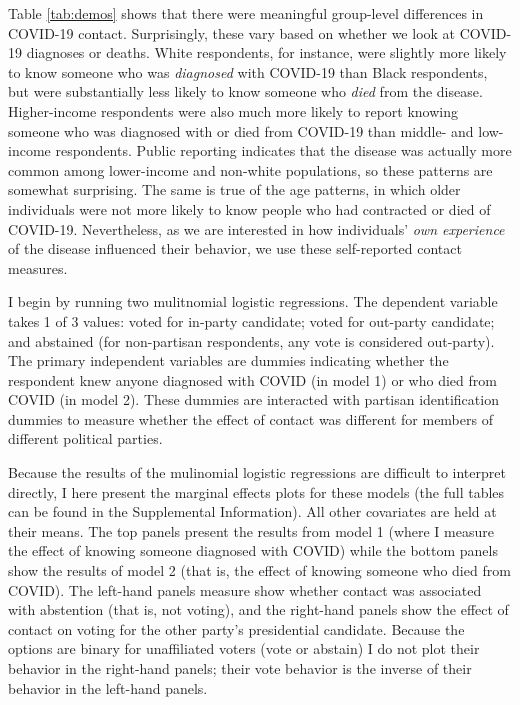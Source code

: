 \documentclass[
  12pt,
]{article}
\begin{document}
Table \ref{tab:demos} shows that there were meaningful group-level differences in COVID-19 contact. Surprisingly, these vary based on whether we look at COVID-19 diagnoses or deaths. White respondents, for instance, were slightly more likely to know someone who was \emph{diagnosed} with COVID-19 than Black respondents, but were substantially less likely to know someone who \emph{died} from the disease. Higher-income respondents were also much more likely to report knowing someone who was diagnosed with or died from COVID-19 than middle- and low-income respondents. Public reporting indicates that the disease was actually more common among lower-income and non-white populations, so these patterns are somewhat surprising. The same is true of the age patterns, in which older individuals were not more likely to know people who had contracted or died of COVID-19. Nevertheless, as we are interested in how individuals' \emph{own experience} of the disease influenced their behavior, we use these self-reported contact measures.

I begin by running two mulitnomial logistic regressions. The dependent variable takes 1 of 3 values: voted for in-party candidate; voted for out-party candidate; and abstained (for non-partisan respondents, any vote is considered out-party). The primary independent variables are dummies indicating whether the respondent knew anyone diagnosed with COVID (in model 1) or who died from COVID (in model 2). These dummies are interacted with partisan identification dummies to measure whether the effect of contact was different for members of different political parties.

Because the results of the mulinomial logistic regressions are difficult to interpret directly, I here present the marginal effects plots for these models (the full tables can be found in the Supplemental Information). All other covariates are held at their means. The top panels present the results from model 1 (where I measure the effect of knowing someone diagnosed with COVID) while the bottom panels show the results of model 2 (that is, the effect of knowing someone who died from COVID). The left-hand panels measure show whether contact was associated with abstention (that is, not voting), and the right-hand panels show the effect of contact on voting for the other party's presidential candidate. Because the options are binary for unaffiliated voters (vote or abstain) I do not plot their behavior in the right-hand panels; their vote behavior is the inverse of their behavior in the left-hand panels.
\end{document}
